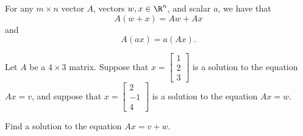 For any $m\times n$ vector $A$, vectors $w,x \in \R^n$, and scalar $a$, we have that 
\[A(w+x) = Aw + Ax\] and
\[A(ax) = a(Ax).\]
  
\endedxtext




Let $A$ be a $4\times 3$ matrix.  Suppose that $x = \left[\begin{array}{c} 1 \\ 2 \\ 3 
\end{array} \right]$ is a solution to the equation $Ax = v$, and suppose that 
$x = \left[\begin{array}{c}  2 \\ -1 \\4
\end{array} \right]$ is a solution to the equation $Ax = w$.  

Find a solution to the equation $Ax = v+w$.  

 





